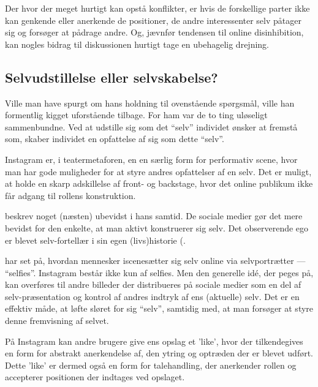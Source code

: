 Der hvor der meget hurtigt kan opstå konflikter, er hvis de 
forskellige parter ikke kan genkende eller anerkende de 
positioner, de andre interessenter selv påtager sig og forsøger at 
pådrage andre. Og, jævnfør tendensen til online disinhibition, kan 
nogles bidrag til diskussionen hurtigt tage en ubehagelig 
drejning.


\subsection{Selvudstillelse eller selvskabelse?}

Ville man have spurgt 
\citeauthor{goffmanPresentationSelfEveryday1956} om hans holdning 
til ovenstående spørgsmål, ville han formentlig kigget uforstående 
tilbage. For ham var de to ting uløseligt sammenbundne. Ved at 
udstille sig som det “selv” individet ønsker at fremstå som, 
skaber individet en opfattelse af sig som dette “selv”.

Instagram er, i teatermetaforen, en en særlig form for performativ 
scene, hvor man har gode muligheder for at styre andres 
opfattelser af en selv. Det er muligt, at holde en skarp 
adskillelse af front- og backstage, hvor det online publikum ikke 
får adgang til rollens konstruktion.

\citeauthor{goffmanPresentationSelfEveryday1956} beskrev noget 
(næsten) ubevidst i hans samtid. De sociale medier gør det mere 
bevidst for den enkelte, at man aktivt konstruerer sig selv.
Det observerende ego er blevet selv-fortellær i sin egen 
(livs)historie (\autocite{sulerSelfPortraitsSelfies2015}.

\citeauthor{sulerSelfPortraitsSelfies2015} har set på, hvordan 
mennesker iscenesætter sig selv online via selvportrætter — 
“selfies”. Instagram består ikke kun af selfies. Men den 
generelle idé, der peges på, kan overføres til andre billeder der 
distribueres på sociale medier som en del af selv-præsentation og
kontrol af andres indtryk af ens (aktuelle) selv. Det er en
effektiv måde, at løfte sløret for sig “selv”, samtidig med, at
man forsøger at styre denne fremvisning af selvet.

På Instagram kan andre brugere give ens opslag et 'like', hvor der 
tilkendegives en form for abstrakt anerkendelse af, den ytring og 
optræden der er blevet udført. Dette 'like' er dermed også en form 
for talehandling, der anerkender rollen og accepterer positionen 
der indtages ved opslaget.

